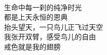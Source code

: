 \begin{poem}[戒行者]
\begin{multicols}{2}
\begin{center}
            ~\\

            生命中每一刹的纯净时光 \\ 都是上天永恒的恩典 \\ 抬头望天，一只鸟儿正飞过天空 \\ 我张开双臂，感受鸟儿的自由 \\ 戒色就是我的翅膀
        \end{center}
    \end{multicols}
\end{poem}